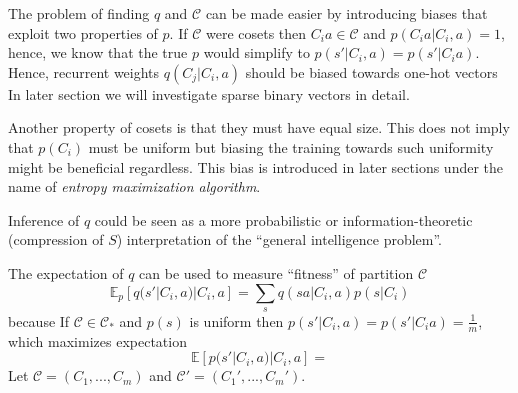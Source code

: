 \documentclass[oneside,english,logo]{amuthesis}
\begin{document}
The problem of finding $q$ and $\mathcal{C}$ can be made easier by introducing biases that exploit two properties of $p$.
If $\mathcal{C}$ were cosets then $C_ia\in \mathcal{C}$ and $p(C_ia|C_i,a)=1$, hence, we know that the true $p$ would simplify to $p(s'|C_i,a)=p(s'|C_ia)$. Hence, recurrent weights $q(C_j|C_i,a)$ should be biased towards one-hot vectors In later section we will investigate sparse binary vectors in detail. 

Another property of cosets is that they must have equal size. This does not imply that $p(C_i)$ must be uniform but biasing the training towards such uniformity might be beneficial regardless. This bias is introduced in later sections under the name of \textit{entropy maximization algorithm}.

Inference of $q$ could be seen as a more probabilistic or information-theoretic (compression of $S$) interpretation of the ``general intelligence problem''.

\iffalse
The expectation of $q$ can be used to measure ``fitness'' of partition $\mathcal{C}$ \[
\mathbb{E}_p[q(s'|C_i,a)|C_i,a] = \sum_{s} q(sa|C_i,a)p(s|C_i) 
\]
because 
If $\mathcal{C} \in \mathcal{C}_*$ and $p(s)$ is uniform then $p(s'|C_i,a)=p(s'|C_ia)=\frac{1}{m}$, which maximizes expectation \[
\mathbb{E}[p(s'|C_i,a)|C_i,a]=
\]
Let $\mathcal{C}=(C_1,...,C_m)$ and $\mathcal{C}'=(C_1',...,C_m')$. 
\end{document}
